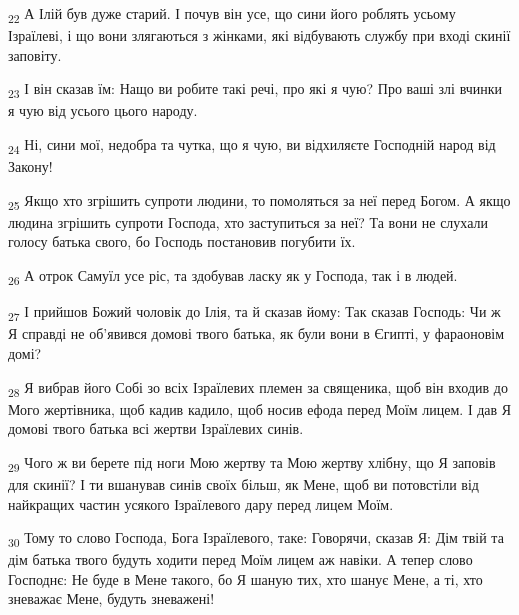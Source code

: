 \begin{tcolorbox}
\textsubscript{22} А Ілій був дуже старий. І почув він усе, що сини його роблять усьому Ізраїлеві, і що вони злягаються з жінками, які відбувають службу при вході скинії заповіту.
\end{tcolorbox}
\begin{tcolorbox}
\textsubscript{23} І він сказав їм: Нащо ви робите такі речі, про які я чую? Про ваші злі вчинки я чую від усього цього народу.
\end{tcolorbox}
\begin{tcolorbox}
\textsubscript{24} Ні, сини мої, недобра та чутка, що я чую, ви відхиляєте Господній народ від Закону!
\end{tcolorbox}
\begin{tcolorbox}
\textsubscript{25} Якщо хто згрішить супроти людини, то помоляться за неї перед Богом. А якщо людина згрішить супроти Господа, хто заступиться за неї? Та вони не слухали голосу батька свого, бо Господь постановив погубити їх.
\end{tcolorbox}
\begin{tcolorbox}
\textsubscript{26} А отрок Самуїл усе ріс, та здобував ласку як у Господа, так і в людей.
\end{tcolorbox}
\begin{tcolorbox}
\textsubscript{27} І прийшов Божий чоловік до Ілія, та й сказав йому: Так сказав Господь: Чи ж Я справді не об'явився домові твого батька, як були вони в Єгипті, у фараоновім домі?
\end{tcolorbox}
\begin{tcolorbox}
\textsubscript{28} Я вибрав його Собі зо всіх Ізраїлевих племен за священика, щоб він входив до Мого жертівника, щоб кадив кадило, щоб носив ефода перед Моїм лицем. І дав Я домові твого батька всі жертви Ізраїлевих синів.
\end{tcolorbox}
\begin{tcolorbox}
\textsubscript{29} Чого ж ви берете під ноги Мою жертву та Мою жертву хлібну, що Я заповів для скинії? І ти вшанував синів своїх більш, як Мене, щоб ви потовстіли від найкращих частин усякого Ізраїлевого дару перед лицем Моїм.
\end{tcolorbox}
\begin{tcolorbox}
\textsubscript{30} Тому то слово Господа, Бога Ізраїлевого, таке: Говорячи, сказав Я: Дім твій та дім батька твого будуть ходити перед Моїм лицем аж навіки. А тепер слово Господнє: Не буде в Мене такого, бо Я шаную тих, хто шанує Мене, а ті, хто зневажає Мене, будуть зневажені!
\end{tcolorbox}
